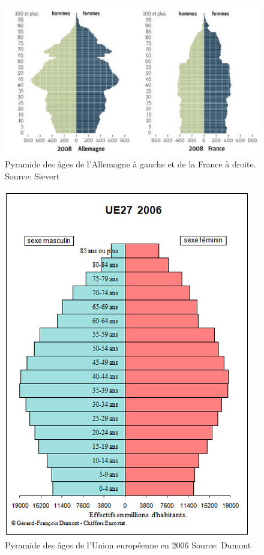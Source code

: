 \begin{figure}[p]
    \begin{center}
        \includegraphics[scale=0.55]{document/pyramide-allemagne-france.png}
        \caption{Pyramide des âges de l'Allemagne à gauche et de la France à droite. Source: Sievert~\citep[pp.27]{frde}}
        \label{pyramide-allemagne-france}
    \end{center}
\end{figure}

\begin{figure}[p]
    \begin{center}
        \includegraphics[scale=0.55]{document/eu-2006.png}
        \caption{Pyramide des âges de l'Union européenne en 2006 Source: Dumont~\citep[pp.3]{pyramide-eu}}
        \label{eu-2006}
    \end{center}
\end{figure}


